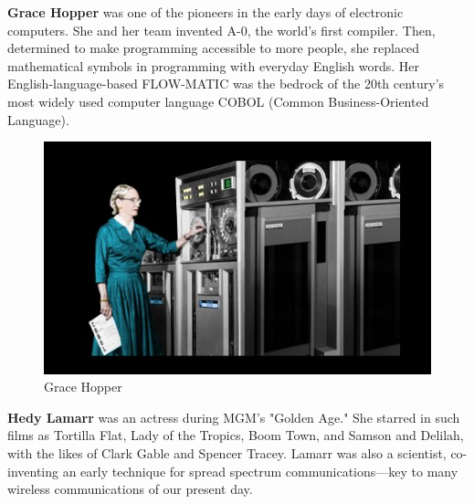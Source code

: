 \documentclass[a4paper,10pt]{article}
\begin{document}
\newblock
\textbf{Grace Hopper} was one of the pioneers in the early days of electronic computers.
She and her team invented A-0, the world’s first compiler.
Then, determined to make programming accessible to more people, she replaced mathematical symbols in programming with everyday English words. Her English-language-based FLOW-MATIC was the bedrock of the 20th century’s most widely used computer language COBOL (Common Business-Oriented Language)\cite{hop}.

\begin{center}
\begin{figure}[h]
\centering
 \includegraphics[scale=0.4]{grace-hopper.jpg}
 \caption{Grace Hopper}
\end{figure}
\end{center}

\newblock
\textbf{Hedy Lamarr} was an actress during MGM's "Golden Age." She starred in such films as Tortilla Flat, Lady of the Tropics, Boom Town, and Samson and Delilah, with the likes of Clark Gable and Spencer Tracey. Lamarr was also a scientist, co-inventing an early technique for spread spectrum communications—key to many wireless communications of our present day\cite{hedy}.
\end{document}
